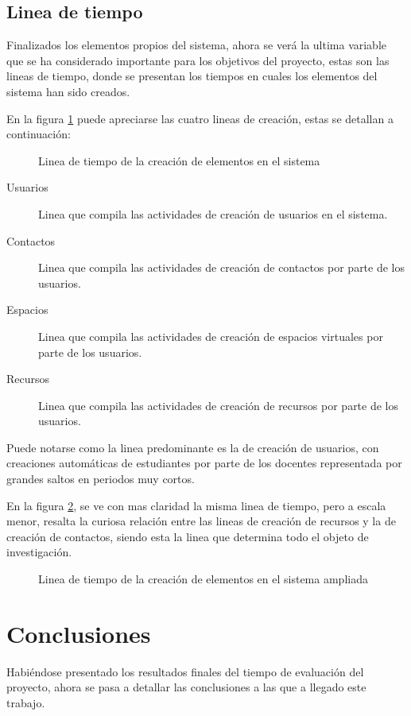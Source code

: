\subsection{Linea de tiempo}
Finalizados los elementos propios del sistema, ahora se verá la ultima variable
que se ha considerado importante para los objetivos del proyecto, estas son las
lineas de tiempo, donde se presentan los tiempos en cuales los elementos del
sistema han sido creados.

En la figura \ref{tiempos_area_1} puede apreciarse las cuatro lineas de
creación, estas se detallan a continuación:

\begin{figure}
\centering

\caption{Linea de tiempo de la creación de elementos en el sistema}
\label{tiempos_area_1}
\end{figure}

\begin{description}
\item [Usuarios] Linea que compila las actividades de creación de usuarios en el
sistema.
\item [Contactos] Linea que compila las actividades de creación de contactos por
parte de los usuarios.
\item [Espacios] Linea que compila las actividades de creación de espacios
virtuales por parte de los usuarios.
\item [Recursos] Linea que compila las actividades de creación de recursos por
parte de los usuarios.
\end{description}

Puede notarse como la linea predominante es la de creación de usuarios, con
creaciones automáticas de estudiantes por parte de los docentes representada por
grandes saltos en periodos muy cortos.

En la figura \ref{tiempos_area_2}, se ve con mas claridad la misma linea de
tiempo, pero a escala menor, resalta la curiosa relación entre las lineas
de creación de recursos y la de creación de contactos, siendo esta la linea que
determina todo el objeto de investigación.

\begin{figure}
\centering

\caption{Linea de tiempo de la creación de elementos en el sistema ampliada}
\label{tiempos_area_2}
\end{figure}

\section{Conclusiones}
Habiéndose presentado los resultados finales del tiempo de evaluación del
proyecto, ahora se pasa a detallar las conclusiones a las que a llegado este
trabajo.

